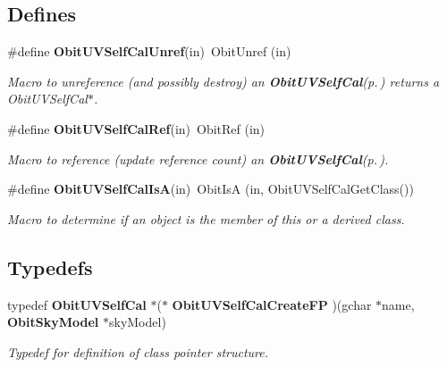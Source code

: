 \subsection*{Defines}
\begin{CompactItemize}
\item 
\#define {\bf Obit\-UVSelf\-Cal\-Unref}(in)\ Obit\-Unref (in)
\begin{CompactList}\small\item\em Macro to unreference (and possibly destroy) an {\bf Obit\-UVSelf\-Cal}{\rm (p.\,\pageref{structObitUVSelfCal})} returns a Obit\-UVSelf\-Cal$\ast$. \item\end{CompactList}\item 
\#define {\bf Obit\-UVSelf\-Cal\-Ref}(in)\ Obit\-Ref (in)
\begin{CompactList}\small\item\em Macro to reference (update reference count) an {\bf Obit\-UVSelf\-Cal}{\rm (p.\,\pageref{structObitUVSelfCal})}. \item\end{CompactList}\item 
\#define {\bf Obit\-UVSelf\-Cal\-Is\-A}(in)\ Obit\-Is\-A (in, Obit\-UVSelf\-Cal\-Get\-Class())
\begin{CompactList}\small\item\em Macro to determine if an object is the member of this or a derived class. \item\end{CompactList}\end{CompactItemize}
\subsection*{Typedefs}
\begin{CompactItemize}
\item 
typedef {\bf Obit\-UVSelf\-Cal} $\ast$($\ast$ {\bf Obit\-UVSelf\-Cal\-Create\-FP} )(gchar $\ast$name, {\bf Obit\-Sky\-Model} $\ast$sky\-Model)
\begin{CompactList}\small\item\em Typedef for definition of class pointer structure. \item\end{CompactList}\end{CompactItemize}
